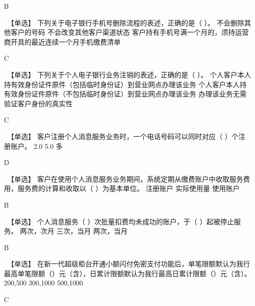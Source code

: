 \documentclass[kindlepaper]{BHCexam4kindle}
\begin{document}
\begin{questions}
\begin{solution} B \end{solution}
\qs　【单选】 下列关于电子银行手机号删除流程的表述，正确的是（   ）。 \xx
{} {  不会删除其他客户的号码 } { 不会改变其他客户渠道状态 } { 客户持有手机号满一个月的，须持运营商开具的最近连续一个月手机缴费清单 }
\begin{solution} C \end{solution}
\qs　【单选】 下列关于个人电子银行业务注销的表述，正确的是（   ）。 \xx
{} {  个人客户本人持有效身份证件原件（包括临时身份证）到营业网点办理该业务 } { 个人客户本人持有效身份证件原件（不包括临时身份证）到营业网点办理该业务 } { 办理该业务无需验证客户身份的真实性 }
\begin{solution} C \end{solution}
\qs　【单选】 客户注册个人消息服务业务时，一个电话号码可以同时对应（   ）个注册账户。 \xx
{} {  2.0 } { 5.0 } { 多 }
\begin{solution} D \end{solution}
\qs　【单选】 客户在使用个人消息服务业务期间，系统定期从缴费账户中收取服务费用，服务费的计算和收取以（   ）为基本单位。 \xx
{} {  注册账户 } { 实际使用量 } { 使用账户 }
\begin{solution} B \end{solution}
\qs　【单选】 个人消息服务（   ）次批量扣费均未成功的账户，于（   ）起被停止服务。 \xx
{} {  两次，次月 } { 三次，当月 } { 两次，当月 }
\begin{solution} B \end{solution}
\qs　【单选】 在新一代超级柜台开通小额闪付免密支付功能后，单笔限额默认为我行最高单笔限额（）元（含），日累计限额默认为我行最高日累计限额（）元（含）。 \xx
{} {  200,500 } { 300,1000 } { 500,1000 }
\begin{solution} C \end{solution}

\end{questions}
\end{document}
